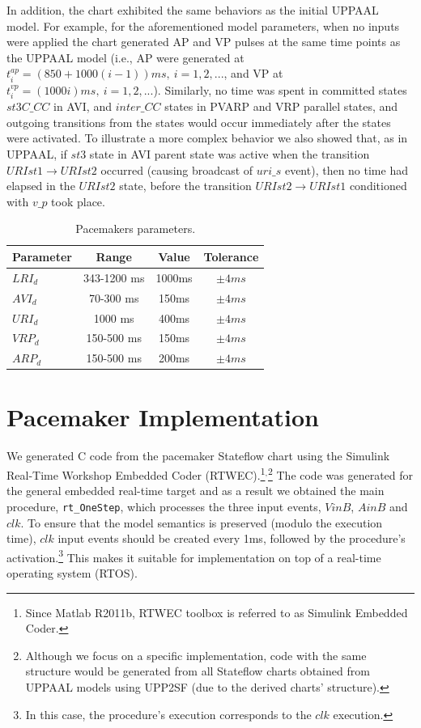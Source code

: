 In addition, the chart exhibited the same behaviors as the initial UPPAAL model. For example, for the aforementioned model parameters, when no inputs were applied the chart generated AP and VP pulses at the same time points as the UPPAAL model (i.e., AP were generated at  $t^{ap}_i=(850+1000(i-1))ms,~i=1,2, ...$, and VP at $t^{vp}_i=(1000i)ms,~i=1,2, ...$). 
Similarly, no time was spent in committed states $st3C\_CC$ in AVI, and $inter\_CC$ states in PVARP and VRP parallel states, and outgoing transitions from the states would occur immediately after the states were activated. To illustrate a more complex behavior we also showed that, as in UPPAAL, if $st3$ state in AVI parent state was active when the transition $URIst1\rightarrow URIst2$ occurred (causing broadcast of $uri\_s$ event), then no time had elapsed in the $URIst2$ state, before the transition $URIst2\rightarrow URIst1$ conditioned with $v\_p$ took place.


\begin{table}[!b]
\center
{
\begin{tabular}{|l|c|c|c|}
\hline
Parameter & Range & Value & Tolerance \\ 
\hline
$LRI_{d}$ & 343-1200 ms & 1000ms & $\pm 4ms$  \\\hline
$AVI_{d}$ & 70-300 ms   &  150ms & $\pm 4ms$  \\\hline
$URI_{d}$ & 1000 ms     &  400ms & $\pm 4ms$  \\\hline
$VRP_{d}$ & 150-500 ms  &  150ms & $\pm 4ms$  \\\hline
$ARP_{d}$ & 150-500 ms  &  200ms & $\pm 4ms$  \\\hline
\end{tabular}}
\caption{Pacemakers parameters.
}
\label{tab:params}
\end{table}

\section{Pacemaker Implementation}
\label{sec:code}


We generated C code from the pacemaker Stateflow chart using the Simulink Real-Time Workshop Embedded Coder (RTWEC).\footnote{Since Matlab R2011b, RTWEC toolbox is referred to as Simulink Embedded Coder.}$^,$\footnote{Although we focus on a specific implementation, code with the same structure would be generated from all Stateflow charts obtained from UPPAAL models using UPP2SF (due to the derived charts' structure).} 
The code was generated for the general embedded real-time target and as a result we obtained the main procedure, \texttt{rt\_OneStep}, which processes the three input events, $VinB$, $AinB$ and $clk$. To ensure that the model semantics is preserved (modulo the execution time), $clk$ input events should be created every 1ms, followed by the procedure's activation.\footnote{In this case, the procedure's execution corresponds to the $clk$ execution.}  This makes it suitable for implementation on top of a real-time operating system (RTOS).

